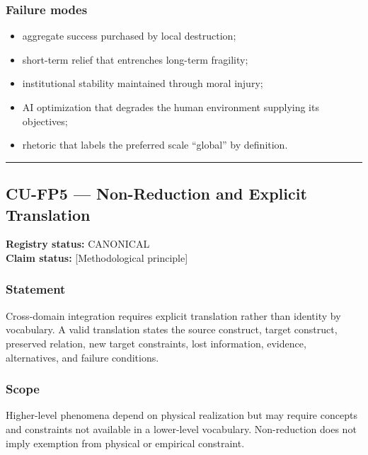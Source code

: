 \documentclass[
  11pt,
]{article}
\providecommand{\tightlist}{%
  \setlength{\itemsep}{0pt}\setlength{\parskip}{0pt}}
\begin{document}
\subsubsection{Failure modes}\label{failure-modes-3}

\begin{itemize}
\tightlist
\item
  aggregate success purchased by local destruction;
\item
  short-term relief that entrenches long-term fragility;
\item
  institutional stability maintained through moral injury;
\item
  AI optimization that degrades the human environment supplying its
  objectives;
\item
  rhetoric that labels the preferred scale ``global'' by definition.
\end{itemize}

\begin{center}\rule{0.5\linewidth}{0.5pt}\end{center}

\subsection{CU-FP5 --- Non-Reduction and Explicit
Translation}\label{cu-fp5-non-reduction-and-explicit-translation}

\textbf{Registry status:} CANONICAL\\
\textbf{Claim status:} {[}Methodological principle{]}

\subsubsection{Statement}\label{statement-4}

Cross-domain integration requires explicit translation rather than
identity by vocabulary. A valid translation states the source construct,
target construct, preserved relation, new target constraints, lost
information, evidence, alternatives, and failure conditions.

\subsubsection{Scope}\label{scope-4}

Higher-level phenomena depend on physical realization but may require
concepts and constraints not available in a lower-level vocabulary.
Non-reduction does not imply exemption from physical or empirical
constraint.
\end{document}

